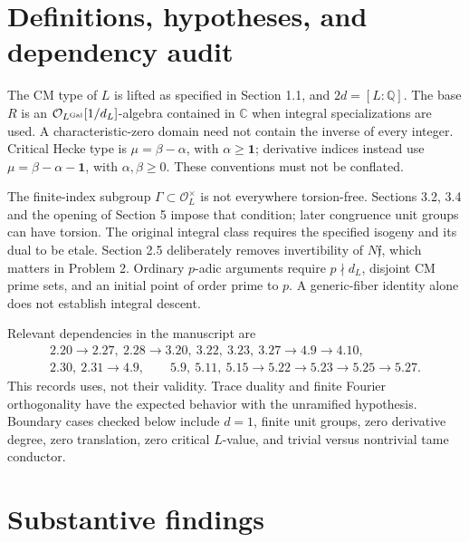 \documentclass[10pt]{article}
\begin{document}
\section*{Definitions, hypotheses, and dependency audit}
The CM type of \(L\) is lifted as specified in Section 1.1, and \(2d=[L:\mathbb Q]\). The base \(R\) is an \(\mathcal O_{L^{\rm Gal}}[1/d_L]\)-algebra contained in \(\mathbb C\) when integral specializations are used. A characteristic-zero domain need not contain the inverse of every integer. Critical Hecke type is \(\mu=\beta-\alpha\), with \(\alpha\geq\mathbf1\); derivative indices instead use \(\mu=\beta-\alpha-\mathbf1\), with \(\alpha,\beta\geq0\). These conventions must not be conflated.\par
The finite-index subgroup \(\Gamma\subset\mathcal O_L^\times\) is not everywhere torsion-free. Sections 3.2, 3.4 and the opening of Section 5 impose that condition; later congruence unit groups can have torsion. The original integral class requires the specified isogeny and its dual to be etale. Section 2.5 deliberately removes invertibility of \(N\mathfrak f\), which matters in Problem 2. Ordinary \(p\)-adic arguments require \(p\nmid d_L\), disjoint CM prime sets, and an initial point of order prime to \(p\). A generic-fiber identity alone does not establish integral descent.\par
Relevant dependencies in the manuscript are \[\begin{gathered}
2.20\longrightarrow2.27,\ 2.28\longrightarrow
3.20,\ 3.22,\ 3.23,\ 3.27\longrightarrow4.9\longrightarrow4.10,\\
2.30,\ 2.31\longrightarrow4.9,\qquad
5.9,\ 5.11,\ 5.15\longrightarrow5.22\longrightarrow5.23
\longrightarrow5.25\longrightarrow5.27.
\end{gathered}\] This records uses, not their validity. Trace duality and finite Fourier orthogonality have the expected behavior with the unramified hypothesis. Boundary cases checked below include \(d=1\), finite unit groups, zero derivative degree, zero translation, zero critical \(L\)-value, and trivial versus nontrivial tame conductor.\par
\section*{Substantive findings}
\end{document}
